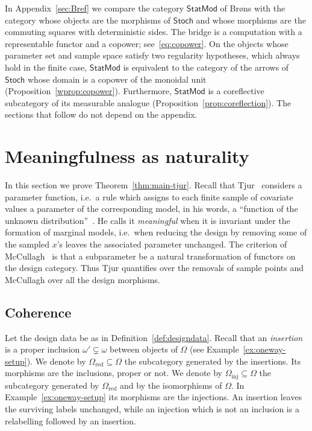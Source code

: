 \documentclass[11pt,a4paper]{article}
\theoremstyle{plain}
\theoremstyle{definition}
\theoremstyle{remark}
\newcommand{\cat}[1]{\mathsf{#1}}
\newcommand{\catO}{\cat{\Omega}}
\newcommand{\Stoch}{\cat{Stoch}}
\newcommand{\StatMod}{\cat{StatMod}}
\begin{document}
In Appendix~\ref{sec:Bref} we compare the category $\StatMod$ of Br\o ns with
the category whose objects are the morphisms of $\Stoch$ and whose morphisms
are the commuting squares with deterministic sides. The bridge is a computation
with a representable functor and a copower; see~\eqref{eq:copower}. On the
objects whose parameter set and sample space satisfy two regularity
hypotheses, which always hold in the finite case, $\StatMod$ is equivalent to
the category of the arrows of $\Stoch$ whose domain is a copower of the
monoidal unit (Proposition~\ref{wprop:copower}). Furthermore, $\StatMod$ is a
coreflective subcategory of its measurable analogue
(Proposition~\ref{prop:coreflection}). The sections that follow do not depend
on the appendix.
\section{Meaningfulness as naturality}\label{sec:meaningful}

In this section we prove Theorem~\ref{thm:main-tjur}. Recall that
Tjur~\cite{tjur_discussion_2002} considers a parameter function, i.e.\ a rule
which assigns to each finite sample of covariate values a parameter of the
corresponding model, in his words, a ``function of the unknown
distribution''~\cite[p.~1299]{tjur_discussion_2002}. He calls it
\emph{meaningful} when it is invariant under the formation of marginal models,
i.e.\ when reducing the design by removing some of the sampled $x$'s leaves
the associated parameter unchanged. The criterion of
McCullagh~\cite[\S4.5]{mccullagh_what_2002} is that a subparameter be a natural
transformation of functors on the design category. Thus Tjur quantifies over
the removals of sample points and McCullagh over all the design morphisms.

\subsection{Coherence}

Let the design data be as in Definition~\ref{def:designdata}. Recall that an
\emph{insertion} is a proper inclusion $\omega' \subsetneq \omega$ between
objects of $\catO$ (see Example~\ref{ex:oneway-setup}). We denote by
$\catO_{\mathrm{red}} \subseteq \catO$ the subcategory generated by the
insertions. Its morphisms are the inclusions, proper or not. We denote by
$\catO_{\mathrm{inj}} \subseteq \catO$ the subcategory generated by
$\catO_{\mathrm{red}}$ and by the isomorphisms of $\catO$. In
Example~\ref{ex:oneway-setup} its morphisms are the injections. An insertion
leaves the surviving labels unchanged, while an injection which is not an
inclusion is a relabelling followed by an insertion.
\end{document}
